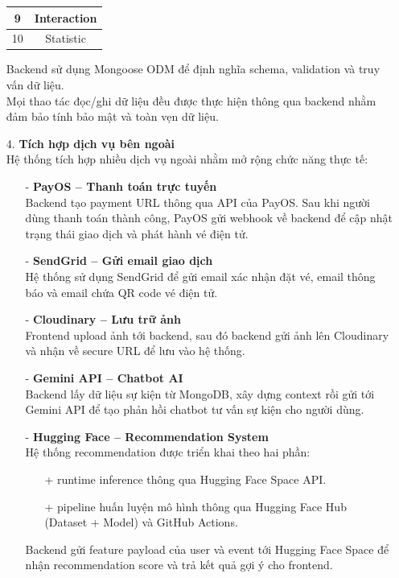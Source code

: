 \begin{itemize}
\begin{table}[H]
\begin{tabular}{|c|c|}
    9 & Interaction \\ \hline
    10 & Statistic \\ \hline
    \end{tabular}
    \end{table}
    Backend sử dụng Mongoose ODM để định nghĩa schema, validation và truy vấn dữ liệu.\\
    Mọi thao tác đọc/ghi dữ liệu đều được thực hiện thông qua backend nhằm đảm bảo tính bảo mật và toàn vẹn dữ liệu.
    \item[4.] \textbf{Tích hợp dịch vụ bên ngoài}\\
    Hệ thống tích hợp nhiều dịch vụ ngoài nhằm mở rộng chức năng thực tế:
    \begin{itemize}
        \item[-] \textbf{PayOS – Thanh toán trực tuyến}\\
        Backend tạo payment URL thông qua API của PayOS. Sau khi người dùng thanh toán thành công, PayOS gửi webhook về backend để cập nhật trạng thái giao dịch và phát hành vé điện tử.
        \item[-] \textbf{SendGrid – Gửi email giao dịch}\\
        Hệ thống sử dụng SendGrid để gửi email xác nhận đặt vé, email thông báo và email chứa QR code vé điện tử.
        \item[-] \textbf{Cloudinary – Lưu trữ ảnh}\\
        Frontend upload ảnh tới backend, sau đó backend gửi ảnh lên Cloudinary và nhận về secure URL để lưu vào hệ thống.
        \item[-] \textbf{Gemini API – Chatbot AI}\\
        Backend lấy dữ liệu sự kiện từ MongoDB, xây dựng context rồi gửi tới Gemini API để tạo phản hồi chatbot tư vấn sự kiện cho người dùng.
        \item[-] \textbf{Hugging Face – Recommendation System}\\
        Hệ thống recommendation được triển khai theo hai phần:
        \begin{itemize}
            \item[+] runtime inference thông qua Hugging Face Space API.
            \item[+] pipeline huấn luyện mô hình thông qua Hugging Face Hub (Dataset + Model) và GitHub Actions.
        \end{itemize}
        Backend gửi feature payload của user và event tới Hugging Face Space để nhận recommendation score và trả kết quả gợi ý cho frontend.\\

\end{itemize}
\end{itemize}
